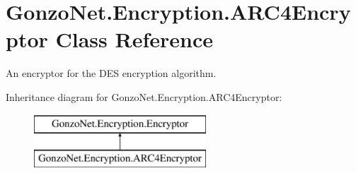 \hypertarget{class_gonzo_net_1_1_encryption_1_1_a_r_c4_encryptor}{\section{Gonzo\+Net.\+Encryption.\+A\+R\+C4\+Encryptor Class Reference}
\label{class_gonzo_net_1_1_encryption_1_1_a_r_c4_encryptor}
}


An encryptor for the D\+E\+S encryption algorithm.  


Inheritance diagram for Gonzo\+Net.\+Encryption.\+A\+R\+C4\+Encryptor\+:\begin{figure}[H]
\begin{center}
\leavevmode
\includegraphics[height=2.000000cm]{class_gonzo_net_1_1_encryption_1_1_a_r_c4_encryptor}
\end{center}
\end{figure}

